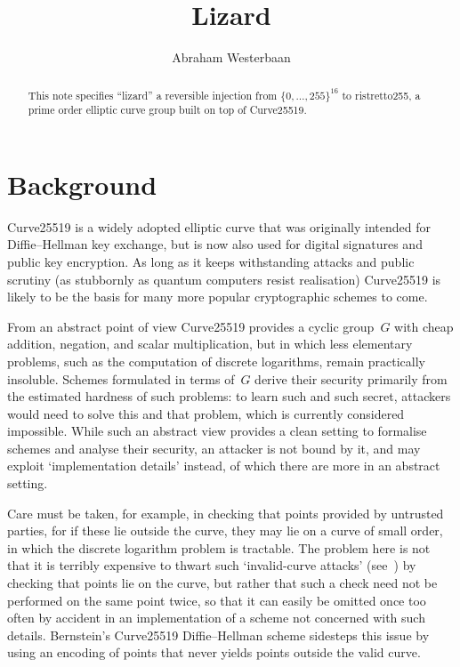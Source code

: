\documentclass{amsproc}
\title{Lizard}
\author{Abraham Westerbaan}
\begin{document}
\maketitle
\begin{abstract}
This note specifies
``lizard''
a reversible injection from $\{0,\dotsc,255\}^{16}$
to ristretto255, a prime order elliptic curve group built 
    on top of Curve25519.
\end{abstract}

\section{Background}
Curve25519 is a widely adopted elliptic curve
that was originally intended\cite{x25519} for 
Diffie--Hellman key exchange,
but is now also used for
digital signatures\cite{ed25519}
and public key encryption\cite{rfc6637}.
As long as it keeps withstanding attacks and public scrutiny
(as stubbornly as quantum computers resist realisation)
Curve25519 is likely to be the basis for many more popular
cryptographic schemes to come.

From an abstract point of view
Curve25519 provides a cyclic group~$G$
with cheap addition, negation, and scalar multiplication,
but in which less elementary problems, 
such as the computation of discrete logarithms,
remain practically insoluble.
Schemes formulated in terms of~$G$
derive their security primarily from 
the estimated hardness of such problems:
to learn such and such secret,
attackers would
need to solve
this and that problem,
which is currently considered impossible.
While such an abstract view
provides a clean setting 
to formalise schemes
and analyse their security,
an attacker is not bound by it,
and may exploit `implementation details' instead,
of which there are more in an abstract setting.

Care must be taken,
for example,
in checking that points provided by untrusted parties,
for if these lie outside the curve,
they may lie on a curve of small order,
in which the discrete logarithm problem is tractable.
The problem here is not that it
is terribly expensive to thwart such `invalid-curve attacks'
(see~\cite{invalidcurveattack,hmqvattack})
by checking that points lie on the curve,
but rather that such a check need not be performed on the same point twice,
so that it can easily be omitted once too often by accident
in an implementation of a scheme not concerned with such details.
Bernstein's Curve25519 Diffie--Hellman scheme sidesteps
this issue by using an encoding of points
that never yields points outside the valid curve.
\end{document}
